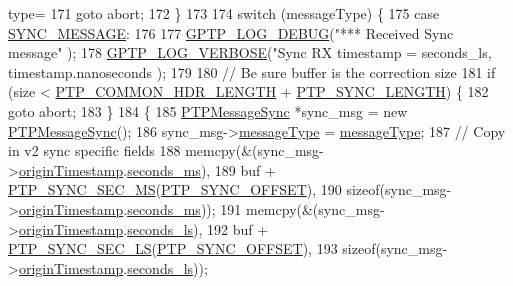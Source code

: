 \begin{DoxyCode}
{{{{{       type=%
171         \textcolor{keywordflow}{goto} abort;
172     \}
173  
174     \textcolor{keywordflow}{switch} (messageType) \{
175     \textcolor{keywordflow}{case} \hyperlink{avbts__message_8hpp_ac6606ebe91c8ac66a2c314c79f5ab013abcf409793602aceef94c1a1f1992791d}{SYNC\_MESSAGE}:
176 
177         \hyperlink{gptp__log_8hpp_ae4c6efe7c9cf6d7d3bbd28a0fd087d61}{GPTP\_LOG\_DEBUG}(\textcolor{stringliteral}{"*** Received Sync message"} );
178         \hyperlink{gptp__log_8hpp_add03384a2a8099b27e07d041cce77e6f}{GPTP\_LOG\_VERBOSE}(\textcolor{stringliteral}{"Sync RX timestamp = %
      seconds\_ls, timestamp.nanoseconds );
179 
180         \textcolor{comment}{// Be sure buffer is the correction size}
181         \textcolor{keywordflow}{if} (size < \hyperlink{avbts__message_8hpp_a8ec4d965b7b1e83844f1c17f12e9b8e4}{PTP\_COMMON\_HDR\_LENGTH} + \hyperlink{avbts__message_8hpp_abc05850b50cf6dd916977904496f83fb}{PTP\_SYNC\_LENGTH}) \{
182             \textcolor{keywordflow}{goto} abort;
183         \}
184         \{
185             \hyperlink{class_p_t_p_message_sync}{PTPMessageSync} *sync\_msg = \textcolor{keyword}{new} \hyperlink{class_p_t_p_message_sync}{PTPMessageSync}();
186             sync\_msg->\hyperlink{class_p_t_p_message_common_adb32627aa5b0e2dbad3ccd88aab07c05}{messageType} = \hyperlink{class_p_t_p_message_common_adb32627aa5b0e2dbad3ccd88aab07c05}{messageType};
187             \textcolor{comment}{// Copy in v2 sync specific fields}
188             memcpy(&(sync\_msg->\hyperlink{class_p_t_p_message_sync_a57a4bfcce938833de582c2ed5138aa3b}{originTimestamp}.\hyperlink{class_timestamp_a5d98378d782519e6f9c17db70f1620f0}{seconds\_ms}),
189                    buf + \hyperlink{avbts__message_8hpp_ab4368be583f1d1f36862ad5ba43a8d66}{PTP\_SYNC\_SEC\_MS}(\hyperlink{avbts__message_8hpp_a6306aedd2fe6dbaf36910d15e9dadbfd}{PTP\_SYNC\_OFFSET}),
190                    \textcolor{keyword}{sizeof}(sync\_msg->\hyperlink{class_p_t_p_message_sync_a57a4bfcce938833de582c2ed5138aa3b}{originTimestamp}.\hyperlink{class_timestamp_a5d98378d782519e6f9c17db70f1620f0}{seconds\_ms}));
191             memcpy(&(sync\_msg->\hyperlink{class_p_t_p_message_sync_a57a4bfcce938833de582c2ed5138aa3b}{originTimestamp}.\hyperlink{class_timestamp_a2bf200e58cd268d8b86cf93c51500a44}{seconds\_ls}),
192                    buf + \hyperlink{avbts__message_8hpp_a81fc69086c8c0eb7d87926abb4b6434f}{PTP\_SYNC\_SEC\_LS}(\hyperlink{avbts__message_8hpp_a6306aedd2fe6dbaf36910d15e9dadbfd}{PTP\_SYNC\_OFFSET}),
193                    \textcolor{keyword}{sizeof}(sync\_msg->\hyperlink{class_p_t_p_message_sync_a57a4bfcce938833de582c2ed5138aa3b}{originTimestamp}.\hyperlink{class_timestamp_a2bf200e58cd268d8b86cf93c51500a44}{seconds\_ls}));
}}}}}}
\end{DoxyCode}
